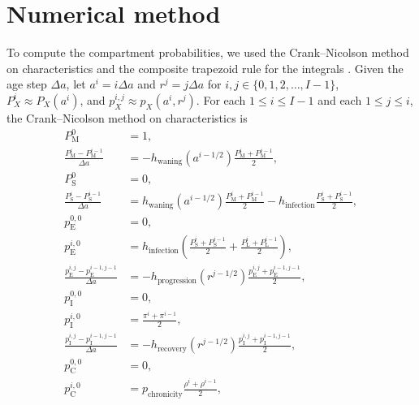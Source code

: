 \documentclass[12pt]{article}
\begin{document}
\section{Numerical method}

To compute the compartment probabilities, we used the Crank--Nicolson
method on characteristics and the composite trapezoid rule for the
integrals \citep{milner_1992}.  Given the age step $\Delta a$, let
$a^i = i \Delta a$ and $r^j = j \Delta a$ for $i, j \in \{0, 1, 2,
\ldots, I - 1\}$, $P_X^i \approx P_X(a^i)$, and $p_X^{i, j} \approx
p_X(a^i, r^j)$.
For each $1 \leq i \leq I - 1$ and each $1 \leq j \leq i$, the
Crank--Nicolson method on characteristics is
\begin{equation}
  \begin{split}
    P_{\mathrm{M}}^0 &= 1,
    \\
    \frac{P_{\mathrm{M}}^i - P_{\mathrm{M}}^{i - 1}}{\Delta a}
    &= - h_{\text{waning}}(a^{i - 1 / 2})
    \frac{P_{\mathrm{M}}^i + P_{\mathrm{M}}^{i - 1}}{2},
    \\
    P_{\mathrm{S}}^0 &= 0,
    \\
    \frac{P_{\mathrm{S}}^i - P_{\mathrm{S}}^{i - 1}}{\Delta a}
    &= h_{\text{waning}}(a^{i - 1 / 2})
    \frac{P_{\mathrm{M}}^i + P_{\mathrm{M}}^{i - 1}}{2}
    - h_{\text{infection}}
    \frac{P_{\mathrm{S}}^i + P_{\mathrm{S}}^{i - 1}}{2},
    \\
    p_{\mathrm{E}}^{0, 0} &= 0,
    \\
    p_{\mathrm{E}}^{i, 0} &= h_{\text{infection}}
    \left(\frac{P_{\mathrm{S}}^i + P_{\mathrm{S}}^{i - 1}}{2}
    + \frac{P_{\mathrm{L}}^i + P_{\mathrm{L}}^{i - 1}}{2}\right),
    \\
    \frac{p_{\mathrm{E}}^{i, j} - p_{\mathrm{E}}^{i - 1, j - 1}}{\Delta a}
    &= - h_{\text{progression}}(r^{j - 1 / 2})
    \frac{p_{\mathrm{E}}^{i, j} + p_{\mathrm{E}}^{i - 1, j - 1}}{2},
    \\
    p_{\mathrm{I}}^{0, 0} &= 0,
    \\
    p_{\mathrm{I}}^{i, 0} &=
    \frac{\pi^i + \pi^{i - 1}}{2},
    \\
    \frac{p_{\mathrm{I}}^{i, j} - p_{\mathrm{I}}^{i - 1, j - 1}}{\Delta a}
    &= - h_{\text{recovery}}(r^{j - 1 / 2})
    \frac{p_{\mathrm{I}}^{i, j} + p_{\mathrm{I}}^{i - 1, j - 1}}{2},
    \\
    p_{\mathrm{C}}^{0, 0} &= 0,
    \\
    p_{\mathrm{C}}^{i, 0} &= p_{\text{chronicity}}
    \frac{\rho^i + \rho^{i - 1}}{2},
    \\

\end{split}
\end{equation}
\end{document}
